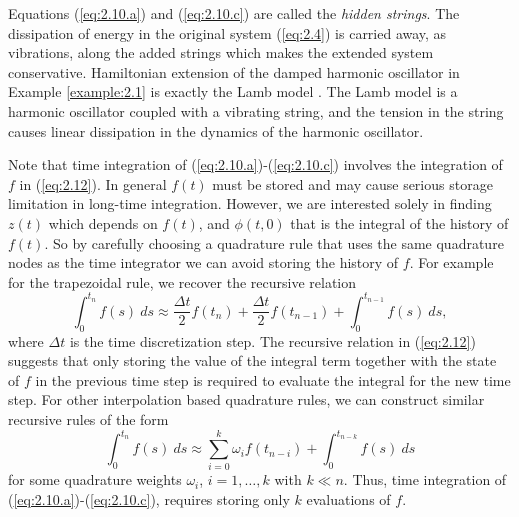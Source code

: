 Equations (\ref{eq:2.10.a}) and (\ref{eq:2.10.c}) are called the \emph{hidden strings}. The dissipation of energy in the original system (\ref{eq:2.4}) is carried away, as vibrations, along the added strings which makes the extended system conservative. Hamiltonian extension of the damped harmonic oscillator in Example \ref{example:2.1} is exactly the Lamb model \cite{lamb:1900}. The Lamb model is a harmonic oscillator coupled with a vibrating string, and the tension in the string causes linear dissipation in the dynamics of the harmonic oscillator.

Note that time integration of (\ref{eq:2.10.a})-(\ref{eq:2.10.c}) involves the integration of $f$ in (\ref{eq:2.12}). In general $f(t)$ must be stored and may cause serious storage limitation in long-time integration. However, we are interested solely in finding $z(t)$ which depends on $f(t)$, and $\phi(t,0)$ that is the integral of the history of $f(t)$. So by carefully choosing a quadrature rule that uses the same quadrature nodes as the time integrator we can avoid storing the history of $f$. For example for the trapezoidal rule, we recover the recursive relation
\begin{equation} \label{eq:2.14}
	\int_{0}^{t_n} f(s) \ ds \approx \frac{\Delta t}{2} f(t_n) + \frac{\Delta t}{2} f(t_{n-1}) + \int_{0}^{t_{n-1}} f(s) \ ds,
\end{equation}
where $\Delta t$ is the time discretization step. The recursive relation in (\ref{eq:2.12}) suggests that only storing the value of the integral term together with the state of $f$ in the previous time step is required to evaluate the integral for the new time step. For other interpolation based quadrature rules, we can construct similar recursive rules of the form
\begin{equation}
	\int_{0}^{t_n} f(s) \ ds \approx \sum_{i=0}^{k} \omega_i f(t_{n-i})  + \int_{0}^{t_{n-k}} f(s) \ ds
\end{equation}
for some quadrature weights $\omega_i$, $i=1,\dots,k$ with $k\ll n$. Thus, time integration of (\ref{eq:2.10.a})-(\ref{eq:2.10.c}), requires storing only $k$ evaluations of $f$.
